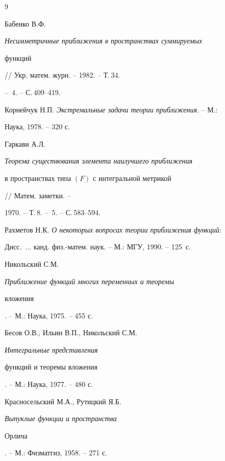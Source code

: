  


\begin{thebibliography}{9} 


 




Бабенко В.Ф. {\em Несимметричные приближения в пространствах суммируемых 


функций} // Укр. матем. журн. -- 1982. -- Т.\,34. 


-- \No\,4. -- С.\,409--419. 




Корнейчук Н.П. {\em Экстремальные задачи теории приближения}. -- М.: 


Наука, 1978. -- 320 с. 




Гаркави А.Л. {\em Теорема существования элемента наилучшего приближения 


в пространствах типа $(F)$ с интегральной метрикой} // Матем. заметки. -- 


1970. -- Т.\,8. -- \No\,5. -- С.\,583--594. 




Рахметов Н.К. {\em О некоторых вопросах теории приближения функций}\/: 


Дисс.~$\dotsc$ канд. физ.-матем. наук. -- М.: МГУ, 1990. -- 125~с. 




Никольский С.М. {\em Приближение функций многих переменных и теоремы 


вложения}. -- М.: Наука, 1975. -- 455 с. 




Бесов О.В., Ильин В.П., Никольский С.М. {\em Интегральные представления 


функций и теоремы вложения}. -- М.: Наука, 1977. -- 480 с. 




Красносельский М.А., Рутицкий Я.Б. {\em Выпуклые функции и пространства 


Орлича}. -- М.: Физматгиз, 1958. -- 271 с. 


 


\end{thebibliography} 


 


\vskip 2cm 


 






 


\label{end} 


 


 


